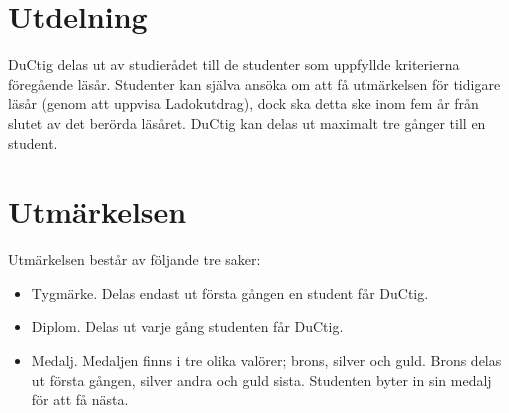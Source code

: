 \documentclass{dsekprotokoll}
\begin{document}
\section{Utdelning}
DuCtig delas ut av studierådet till de studenter som uppfyllde kriterierna föregående läsår. Studenter kan själva ansöka om att få utmärkelsen för tidigare läsår (genom att uppvisa Ladokutdrag), dock ska detta ske inom fem år från slutet av det berörda läsåret. DuCtig kan delas ut
maximalt tre gånger till en student.

\section{Utmärkelsen}
Utmärkelsen består av följande tre saker:
\begin{itemize}
	\item Tygmärke. Delas endast ut första gången en student får DuCtig.
	\item Diplom. Delas ut varje gång studenten får DuCtig.
	\item Medalj. Medaljen finns i tre olika valörer; brons, silver och guld. Brons delas ut första
	      gången, silver andra och guld sista. Studenten byter in sin medalj för att få nästa.
\end{itemize}
\end{document}
